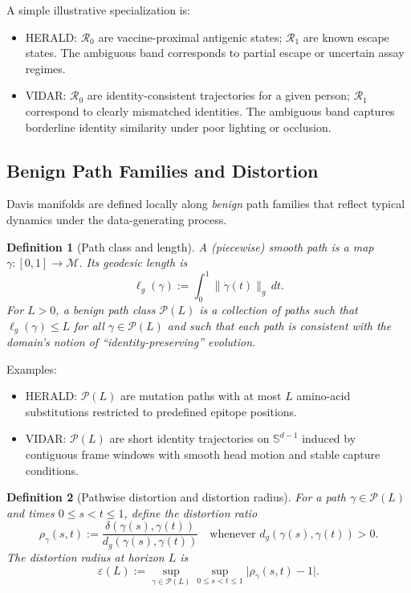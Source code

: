 \documentclass[11pt]{article}
\newtheorem{definition}{Definition}
\begin{document}
A simple illustrative specialization is:
\begin{itemize}
    \item HERALD: $\mathcal{R}_0$ are vaccine-proximal antigenic states; $\mathcal{R}_1$ are
    known escape states. The ambiguous band corresponds to partial escape or uncertain assay
    regimes.
    \item VIDAR: $\mathcal{R}_0$ are identity-consistent trajectories for a given person;
    $\mathcal{R}_1$ correspond to clearly mismatched identities. The ambiguous band captures
    borderline identity similarity under poor lighting or occlusion.
\end{itemize}

\subsection{Benign Path Families and Distortion}
\label{subsec:paths}

Davis manifolds are defined locally along \emph{benign} path families that reflect typical
dynamics under the data-generating process.

\begin{definition}[Path class and length]\label{def:path-family}
A (piecewise) smooth path is a map $\gamma:[0,1] \to \mathcal{M}$. Its geodesic length is
\[
    \ell_g(\gamma) := \int_0^1 \|\dot{\gamma}(t)\|_{g}\, dt.
\]
For $L>0$, a benign path class $\mathcal{P}(L)$ is a collection of paths such that
$\ell_g(\gamma) \le L$ for all $\gamma \in \mathcal{P}(L)$ and such that each path is
consistent with the domain's notion of ``identity-preserving'' evolution.
\end{definition}

Examples:
\begin{itemize}
    \item HERALD: $\mathcal{P}(L)$ are mutation paths with at most $L$ amino-acid
    substitutions restricted to predefined epitope positions.
    \item VIDAR: $\mathcal{P}(L)$ are short identity trajectories on $\mathbb{S}^{d-1}$
    induced by contiguous frame windows with smooth head motion and stable capture conditions.
\end{itemize}

\begin{definition}[Pathwise distortion and distortion radius]
For a path $\gamma\in\mathcal{P}(L)$ and times $0\le s<t\le 1$, define the distortion ratio
\[
    \rho_{\gamma}(s,t)
    :=
    \frac{\delta(\gamma(s),\gamma(t))}{d_g(\gamma(s),\gamma(t))}
    \quad\text{whenever } d_g(\gamma(s),\gamma(t))>0.
\]
The \emph{distortion radius} at horizon $L$ is
\[
    \varepsilon(L)
    :=
    \sup_{\gamma\in\mathcal{P}(L)}
    \sup_{0\le s<t\le 1}
    \bigl|\rho_{\gamma}(s,t) - 1\bigr|.
\]
\end{definition}
\end{document}
